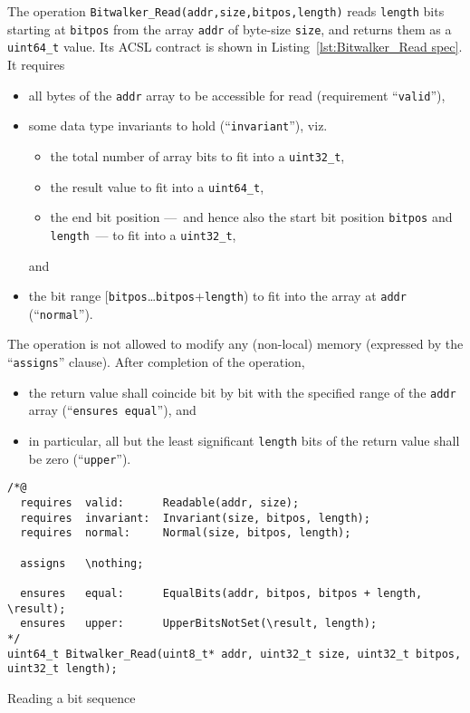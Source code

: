 The operation \lstinline{Bitwalker_Read(addr,size,bitpos,length)} reads
\lstinline{length} bits starting at \lstinline{bitpos} from the array
\lstinline{addr} of byte-size \lstinline{size}, and returns them as a
\lstinline{uint64_t} value.
%
Its ACSL contract is shown in Listing~\ref{lst:Bitwalker_Read spec}.
%
It requires
%
\begin{itemize}
\item all bytes of the \lstinline{addr} array to be accessible for read
	(requirement ``\lstinline{valid}''),
\item some data type invariants to hold
	(``\lstinline{invariant}''), viz.\
	\begin{itemize}
	\item the total number of array bits to fit into a \lstinline{uint32_t},
	\item the result value to fit into a \lstinline{uint64_t},
	\item the end bit position ---~and hence also the start bit position
		\lstinline{bitpos} and \lstinline{length}~---
		to fit into a \lstinline{uint32_t}, 
	\end{itemize}
	and
\item the bit range [\lstinline{bitpos}\ldots\lstinline{bitpos}+\lstinline{length})
	to fit into the array at \lstinline{addr}
	(``\lstinline{normal}'').
\end{itemize}
%
The operation is not allowed to modify any (non-local) memory (expressed by the
``\lstinline{assigns}'' clause).
%
After completion of the operation,
%
\begin{itemize}
\item the return value shall coincide bit by bit with the specified range of the
	\lstinline{addr} array (``\lstinline{ensures equal}''), and
\item in particular, all but the least significant \lstinline{length} bits of the return
	value shall be zero (``\lstinline{upper}'').
\end{itemize}







\begin{listing}[hbt]
\begin{minipage}{0.99\textwidth}
\begin{lstlisting}[style=acsl-block]
/*@
  requires  valid:      Readable(addr, size);
  requires  invariant:  Invariant(size, bitpos, length);
  requires  normal:     Normal(size, bitpos, length);

  assigns   \nothing;

  ensures   equal:      EqualBits(addr, bitpos, bitpos + length, \result);
  ensures   upper:      UpperBitsNotSet(\result, length);
*/
uint64_t Bitwalker_Read(uint8_t* addr, uint32_t size, uint32_t bitpos, uint32_t length);
\end{lstlisting}
\end{minipage}
\caption{\label{lst:Bitwalker_Read spec}Reading a bit sequence}
\end{listing}





